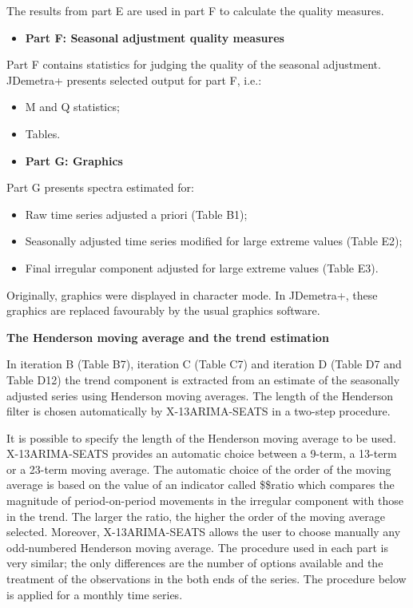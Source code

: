\documentclass[
  letterpaper,
  DIV=11,
  numbers=noendperiod]{scrreprt}
\providecommand{\tightlist}{%
  \setlength{\itemsep}{0pt}\setlength{\parskip}{0pt}}\usepackage{longtable,booktabs,array}
\begin{document}
The results from part E are used in part F to calculate the quality
measures.

\begin{itemize}
\tightlist
\item
  \textbf{Part F: Seasonal adjustment quality measures}
\end{itemize}

Part F contains statistics for judging the quality of the seasonal
adjustment. JDemetra+ presents selected output for part F, i.e.:

\begin{itemize}
\item
  M and Q statistics;
\item
  Tables.
\end{itemize}

\begin{itemize}
\tightlist
\item
  \textbf{Part G: Graphics}
\end{itemize}

Part G presents spectra estimated for:

\begin{itemize}
\item
  Raw time series adjusted a priori (Table B1);
\item
  Seasonally adjusted time series modified for large extreme values
  (Table E2);
\item
  Final irregular component adjusted for large extreme values (Table
  E3).
\end{itemize}

Originally, graphics were displayed in character mode. In JDemetra+,
these graphics are replaced favourably by the usual graphics software.

\textbf{The Henderson moving average and the trend estimation}

In iteration B (Table B7), iteration C (Table C7) and iteration D (Table
D7 and Table D12) the trend component is extracted from an estimate of
the seasonally adjusted series using Henderson moving averages. The
length of the Henderson filter is chosen automatically by
X-13ARIMA-SEATS in a two-step procedure.

It is possible to specify the length of the Henderson moving average to
be used. X-13ARIMA-SEATS provides an automatic choice between a 9-term,
a 13-term or a 23-term moving average. The automatic choice of the order
of the moving average is based on the value of an indicator called
\$\$ratio which compares the magnitude
of period-on-period movements in the irregular component with those in
the trend. The larger the ratio, the higher the order of the moving
average selected. Moreover, X-13ARIMA-SEATS allows the user to choose
manually any odd‑numbered Henderson moving average. The procedure used
in each part is very similar; the only differences are the number of
options available and the treatment of the observations in the both ends
of the series. The procedure below is applied for a monthly time series.
\end{document}
